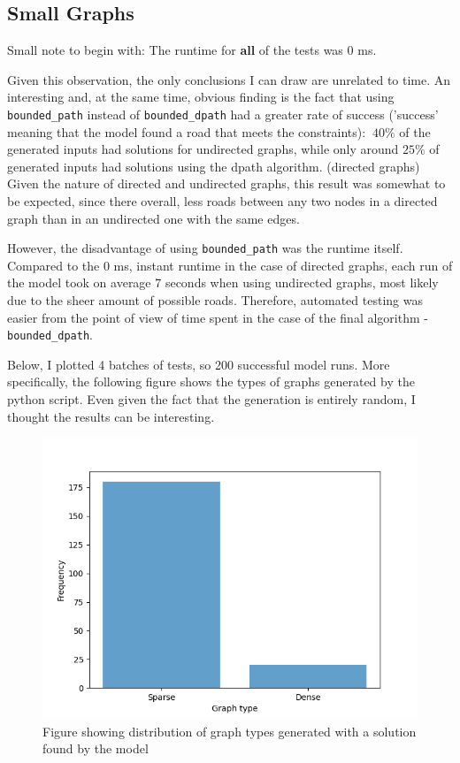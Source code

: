 \documentclass{article}
\begin{document}
\subsection{Small Graphs}
Small note to begin with: The runtime for \textbf{all} of the tests was 0 ms. 

Given this observation, the only conclusions I can
draw are unrelated to time. An interesting and, at the same time, obvious finding is the fact that using \texttt{bounded\_path} 
instead of \texttt{bounded\_dpath} had a greater rate of success ('success' meaning that the model found a road that meets the constraints): 
$~40\%$ of the generated inputs had solutions for undirected graphs, while only around $25\%$ of generated inputs had solutions using the 
dpath algorithm. (directed graphs) Given the nature of directed and undirected graphs, this result was somewhat to be expected, since there 
overall, less roads between any two nodes in a directed graph than in an undirected one with the same edges. 

However, the disadvantage of using \texttt{bounded\_path} was the runtime itself. Compared to the 0 ms, instant runtime in the case of directed 
graphs, each run of the model took on average 7 seconds when using undirected graphs, most likely due to the sheer amount of possible roads. 
Therefore, automated testing was easier from the point of view of time spent in the case of the final algorithm - \texttt{bounded\_dpath}.

Below, I plotted 4 batches of tests, so 200 successful model runs. More specifically, the following figure shows the types of 
graphs generated by the python script. Even given the fact that the generation is entirely random, I thought the results can be interesting.

\begin{figure}[ht]
    \centering 
    \includegraphics[width=0.8\linewidth]{../images/figure1.png}
    \caption{Figure showing distribution of graph types generated with a solution found by the model}
\end{figure}
\end{document}
